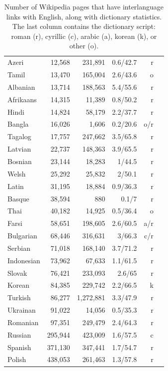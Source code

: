 \documentclass{article}
\newcommand{\mnote}[1]{\marginpar{%
  \vskip-\baselineskip
  \raggedright\footnotesize
  \itshape\hrule\smallskip\tiny{#1}\par\smallskip\hrule}}
\newcommand{\mtodo}[1]{\mnote{\textcolor{red}{#1}}}
\begin{document}
\begin{table}[h!]
\begin{center}
\begin{tabular}{lrrrrr}
Azeri	&	12,568	&	231,891&	0.6/42.7	&	r\\
Tamil	&	13,470	&	165,004	&	2.6/43.6	&	o\\
Albanian 	&	13,714	&	188,563	&	5.4/55.6	&	r\\
Afrikaans	&	14,315	&	11,389	&	0.8/50.2	&	r\\
Hindi 	&	14,824	&	58,179	&	2.2/37.7	&	r\\
Bangla 	&	16,026	&	1,606	&	0.2/20.6	&	o/r\\
Tagalog	&	17,757	&	247,662	&	3.5/65.8	&	r\\
Latvian	&	22,737	&	148,363	&	3.9/65.5	&	r\\
Bosnian 	&	23,144	&	18,283	&	1/44.5	&	r\\
Welsh	&	25,292	&	25,832	&	2/50.1	&	r\\
Latin 	&	31,195	&	18,884	&	0.9/36.3	&	r\\
Basque 	&	38,594	&	880	&	0.1/7	&	r\\
Thai	&	40,182	&14,925	&	0.5/36.4	&	o\\
Farsi	&	58,651	&198,605	&	2.6/60.5	&	a/r\\
Bulgarian 	&	68,446	&	316,631	&	3/66.3	&	c/r\\
Serbian	&	71,018	&	168,140	&	3.7/71.2	&	r\\
Indonesian 	&	73,962	&	67,633	&	1.1/61.5	&	r\\
Slovak 	&	76,421	&	233,093	&	2.6/65	&	r\\
Korean	&	84,385	&	229,742	&	2.2/66.5	&	k\\
Turkish 	&	86,277	&	1,272,881	&	3.3/47.9	&	r\\
Ukrainan	&	91,022	&	14,056	&	0.5/35.3	&	r\\
Romanian	&	97,351	&	249,479	&	2.4/64.3	&	r\\
Russian	&	295,944	&	423,009	&	1.6/57.5	&	c\\
Spanish 	&	371,130	&	347,441	&	1.7/54.7	&	r\\
Polish	&	438,053	&	261,463	&	1.3/57.8	&	r\\
\end{tabular}
\end{center}
\normalsize
\caption{Number of Wikipedia pages that have interlanguage links with English, along with dictionary statistics.  The last column contains the dictionary script: roman (r), cyrillic (c), arabic (a), korean (k), or other (o).}
\label{fig:wikidictstats}
\end{table}

\end{document}
